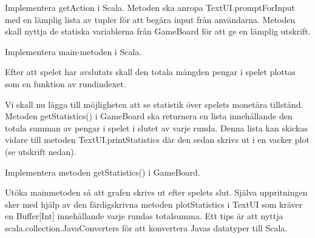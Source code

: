 \Subtask Implementera getAction i Scala. Metoden ska anropa TextUI.promptForInput med en lämplig lista av tupler för att begära input från användarna. Metoden skall nyttja de statiska variablerna från GameBoard för att ge en lämplig utskrift.

\Subtask Implementera main-metoden i Scala.

\Subtask Efter att spelet har avslutats skall den totala mängden pengar i spelet plottas som en funktion av rundindexet.  



\Task Vi skall nu lägga till möjligheten att se statistik över spelets monetära tillstånd. Metoden getStatistics() i GameBoard  ska returnera en lista innehållande den totala summan av pengar i spelet i slutet av varje runda. Denna lista kan skickas vidare till metoden TextUI.printStatistics där den sedan skrivs ut i en vacker plot (se utskrift nedan).

\Subtask Implementera metoden getStatistics() i GameBoard.

\Subtask Utöka mainmetoden så att grafen skrivs ut efter spelets slut. 
Själva uppritningen sker med hjälp av den färdigskrivna metoden plotStatistics i TextUI som kräver en Buffer[Int] innehållande varje rundas totalsumma. 
Ett tips är att nyttja scala.collection.JavaConverters för att konvertera Javas datatyper till Scala.


